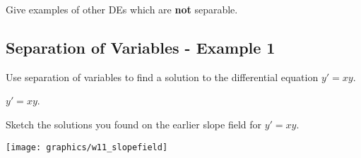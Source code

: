 \documentclass[12pt]{amsart}
\begin{document}
\newpage

Give examples of other DEs which are {\bf not} separable. 

\newpage
{}
\subsection*{Separation of Variables - Example 1}
\begin{problem}
Use separation of variables to find a solution to the differential equation $y' = xy$.
\end{problem}


\newpage
\hfill $y' = xy$.

\newpage

\begin{problem}
  Sketch the solutions you found on the earlier slope field for $y' = xy$.
\begin{center}
\texttt{[image: graphics/w11\_slopefield]}
\end{center}
\end{problem}


\end{document}
